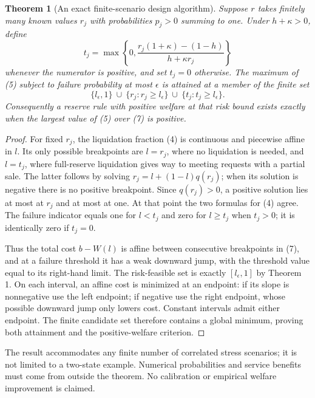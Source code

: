 \documentclass[11pt]{article}
\newtheorem{theorem}{Theorem}
\theoremstyle{remark}
\begin{document}
\begin{theorem}[An exact finite-scenario design algorithm]
Suppose $r$ takes finitely many known values $r_j$ with probabilities
$p_j>0$ summing to one. Under $h+\kappa>0$, define
\[
 t_j=\max\left\{0,
 \frac{r_j(1+\kappa)-(1-h)}{h+\kappa r_j}\right\}                 \tag{6}
\]
whenever the numerator is positive, and set $t_j=0$ otherwise.
The maximum of (5) subject to failure probability at most $\epsilon$
is attained at a member of the finite set
\[
 \{l_\epsilon,1\}\ \cup\
 \{r_j:r_j\geq l_\epsilon\}\ \cup\
 \{t_j:t_j\geq l_\epsilon\}.                                    \tag{7}
\]
Consequently a reserve rule with positive welfare at that risk bound
exists exactly when the largest value of (5) over (7) is positive.
\end{theorem}
\begin{proof}
For fixed $r_j$, the liquidation fraction (4) is continuous and piecewise
affine in $l$. Its only possible breakpoints are $l=r_j$, where no
liquidation is needed, and $l=t_j$, where full-reserve liquidation gives
way to meeting requests with a partial sale. The latter follows by solving
$r_j=l+(1-l)q(r_j)$; when its solution is negative there is no positive
breakpoint. Since $q(r_j)>0$, a positive solution lies at most at $r_j$
and at most at one. At that point the two formulas for (4) agree.
The failure indicator equals one for $l<t_j$ and zero for $l\geq t_j$
when $t_j>0$; it is identically zero if $t_j=0$.

Thus the total cost $b-W(l)$ is affine between consecutive breakpoints
in (7), and at a failure threshold it has a weak downward jump, with
the threshold value equal to its right-hand limit. The risk-feasible set
is exactly $[l_\epsilon,1]$ by Theorem 1. On each interval, an affine
cost is minimized at an endpoint: if its slope is nonnegative use the
left endpoint; if negative use the right endpoint, whose possible
downward jump only lowers cost. Constant intervals admit either endpoint.
The finite candidate set therefore contains a global minimum, proving
both attainment and the positive-welfare criterion.
\end{proof}
The result accommodates any finite number of correlated stress scenarios;
it is not limited to a two-state example. Numerical probabilities and
service benefits must come from outside the theorem. No calibration or
empirical welfare improvement is claimed.
\end{document}
